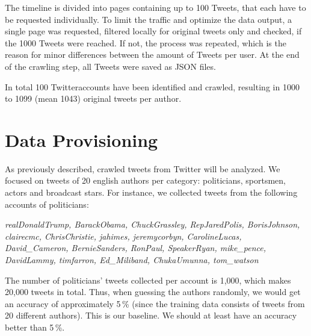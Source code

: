 \documentclass[journal, a4paper, 12pt]{IEEEtran}
\begin{document}
The timeline is divided into pages containing up to 100 Tweets, that each have to be requested individually. To limit the traffic and optimize the data output, a single page was requested, filtered locally for original tweets only and checked, if the 1000 Tweets were reached. If not, the process was repeated, which is the reason for minor differences between the amount of Tweets per user. At the end of the crawling step, all Tweets were saved as JSON files. 

In total 100 Twitteraccounts have been identified and crawled, resulting in 1000 to 1099 (mean 1043) original tweets per author.

\section{Data Provisioning}
\label{sec:provisioning}
\vspace{-2mm}
As previously described, crawled tweets from Twitter will be analyzed. We focused on tweets of 20 english authors per category: politicians, sportsmen, actors and broadcast stars. For instance, we collected tweets from the following accounts of politicians:

\footnotesize
\textit{
realDonaldTrump, BarackObama, ChuckGrassley, RepJaredPolis, BorisJohnson, clairecmc, ChrisChristie, jahimes, jeremycorbyn, CarolineLucas, David\_Cameron, BernieSanders, RonPaul, SpeakerRyan, mike\_pence, DavidLammy, timfarron, Ed\_Miliband, ChukaUmunna, tom\_watson
}
\normalsize

The number of politicians' tweets collected per account is 1,000, which makes 20,000 tweets in total. Thus, when guessing the authors randomly, we would get an accuracy of approximately 5\,\% (since the training data consists of tweets from 20 different authors). This is our baseline. We should at least have an accuracy better than 5\,\%.
\end{document}
